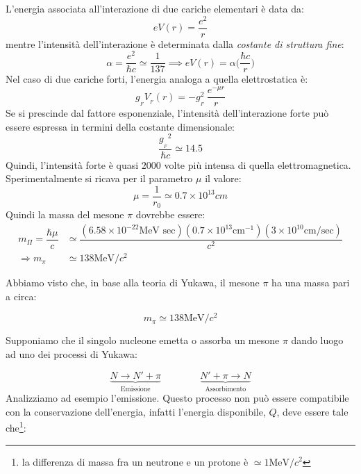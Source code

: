 L'energia associata all'interazione di due cariche elementari è data da:
\begin{equation*}
e V(r) = \dfrac{e^2}{r}
\end{equation*}
mentre l'intensità dell'interazione è determinata dalla \textit{costante di
struttura fine}:
\begin{equation*}
\alpha = \dfrac{e^2}{\hbar c} \simeq \dfrac{1}{137} \implies e V(r) = \alpha 
\Biggl(\dfrac{\hbar c}{r}\Biggr)
\end{equation*}
Nel caso di due cariche forti, l'energia analoga a quella elettrostatica è:
\begin{equation*}
g_{_{F}}V_{_F}(r) = - {g^2_{_{F}}} \ \dfrac{e^{-\mu r}}{r}
\end{equation*}
Se si prescinde dal fattore esponenziale, l'intensità dell'interazione forte 
può
essere espressa in termini della costante dimensionale:
\begin{equation*}
\dfrac{{{g}_{_F}}^2}{\hbar c} \simeq 14.5
\end{equation*}
Quindi, l'intensità forte è quasi $2000$ volte più intensa di quella
elettromagnetica. Sperimentalmente si ricava per il parametro $\mu$ il valore:
\begin{equation*}
\mu = \dfrac{1}{r_0} \simeq 0.7 	\times 10^{13} cm
\end{equation*}
Quindi la massa del mesone $\pi$ dovrebbe essere:
\begin{align*}
m_{\Pi} = \dfrac{\hbar \mu}{c} &\simeq \dfrac{(6.58 \times 10^{-22} \text{MeV
sec}) (0.7 \times 10^{13} \text{cm}^{-1}) (3 \times 10^{10} \text{cm/sec} 
)}{c^2} \\
\Rightarrow m_{\pi} &\simeq 138 \text{MeV}/c^2
\end{align*}

\breaknote

Abbiamo  visto che, in base alla teoria di Yukawa, il
mesone $\pi$ ha una massa pari a circa:

\begin{equation*}
  m_{\pi} \simeq 138 \text{MeV}/c^2
\end{equation*}

Supponiamo che il singolo nucleone emetta o assorba un mesone $\pi$ dando luogo
ad uno dei processi di Yukawa:

\begin{equation*}
  \underbrace{N \to N' + \pi}_\text{Emissione} \qquad \qquad \underbrace{N' +
  \pi \to N}_\text{Assorbimento}
\end{equation*}
Analizziamo ad esempio l'emissione. Questo processo non può essere compatibile
con la conservazione dell'energia, infatti l'energia disponibile, $Q$, deve
essere tale che\footnote{la differenza di massa fra un neutrone e un protone
è $\simeq 1\text{MeV}/c^2$}:


